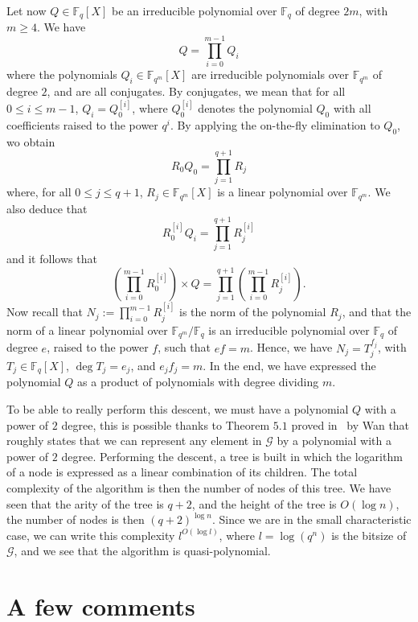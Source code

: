 \documentclass[a4paper,11pt]{article}
\theoremstyle{break}
\theoremstyle{sc}
\theoremstyle{definition}
\theoremstyle{remark}
\begin{document}
Let now $Q\in\mathbb{F}_{q}[X]$ be an irreducible polynomial over $\mathbb{F}_{q}$ of degree
$2m$, with $m\geq4$. We have
\[
  Q = \prod_{i=0}^{m-1}Q_{i}
\]
where the polynomials $Q_i\in\mathbb{F}_{q^m}[X]$ are irreducible
polynomials over $\mathbb{F}_{q^m}$ of degree $2$, and are all
conjugates. By conjugates, we mean that for all $0\leq i\leq m-1$,
$Q_i=Q_0^{[i]}$, where $Q_0^{[i]}$ denotes the polynomial $Q_0$ with all
coefficients raised to the power $q^i$. By applying the on-the-fly
elimination to $Q_0$, wo obtain 
\[
  R_0Q_0=\prod_{j=1}^{q+1}R_j
\]
where, for all $0\leq j\leq q+1$, $R_j\in\mathbb{F}_{q^m}[X]$ is a linear
polynomial over $\mathbb{F}_{q^m}$. We also deduce that
\[
  R_{0}^{[i]}Q_i=\prod_{j=1}^{q+1}R_j^{[i]}
\]
and it follows that
\[
  (\prod_{i=0}^{m-1}R_{0}^{[i]})\times Q =
  \prod_{j=1}^{q+1}(\prod_{i=0}^{m-1}R_j^{[i]}).
\]
Now recall that $N_j:=\prod_{i=0}^{m-1}R_{j}^{[i]}$ is the norm of the
polynomial $R_j$, and that the norm of a linear polynomial over
$\mathbb{F}_{q^m}/\mathbb{F}_q$ is an irreducible polynomial over
$\mathbb{F}_q$ of degree
$e$, raised to the power $f$, such that $ef=m$. Hence, we have
$N_j=T_j^{f_j}$, with $T_j\in\mathbb{F}_{q}[X]$, $\deg T_j = e_j$, and
$e_jf_j=m$. In the end, we have expressed the polynomial $Q$ as a product of
polynomials with degree dividing $m$.

To be able to really perform this descent, we must have a polynomial $Q$ with a 
power of $2$ degree, this is possible thanks to Theorem $5.1$ proved 
in~\cite{Wan97} by Wan that roughly states that we can represent any element in
$\mathcal G$ by a polynomial with a power of $2$ degree. Performing the
descent, a tree is built in which the logarithm of a node is expressed
as a linear combination of its children. The total complexity of the algorithm
is then the number of nodes of this tree. We have seen that the arity of the
tree is $q+2$, and the height of the tree is $O(\log n)$, the number of nodes
is then $(q+2)^{\log n}$. Since we are in the small characteristic case, we
can write this complexity $l^{O(\log l)}$, where $l=\log(q^n)$ is the bitsize of
$\mathcal G$, and we see that the algorithm is quasi-polynomial.
\section{A few comments}
\end{document}
